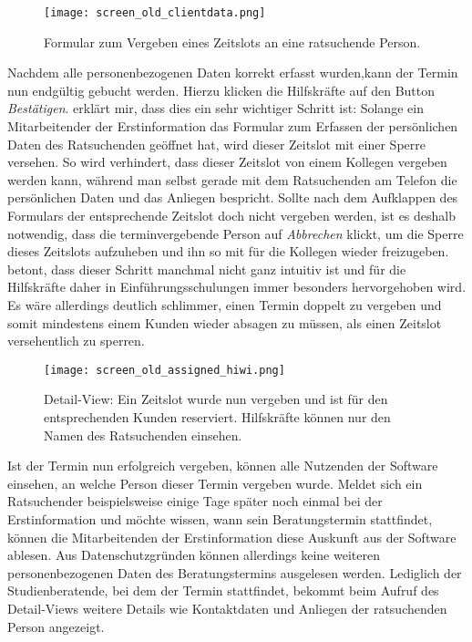 \begin{figure}[H]
    \caption{Formular zum Vergeben eines Zeitslots an eine ratsuchende Person.}
    \centering
    \texttt{[image: screen\_old\_clientdata.png]}
\end{figure}

Nachdem alle personenbezogenen Daten korrekt erfasst wurden,kann der Termin nun
endgültig gebucht werden. Hierzu klicken die Hilfskräfte auf den Button
\textit{Bestätigen}. \ipName erklärt mir, dass dies ein sehr wichtiger Schritt
ist: Solange ein Mitarbeitender der Erstinformation das Formular zum Erfassen
der persönlichen Daten des Ratsuchenden geöffnet hat, wird dieser Zeitslot mit
einer Sperre versehen. So wird verhindert, dass dieser Zeitslot von einem
Kollegen vergeben werden kann, während man selbst gerade mit dem Ratsuchenden
am Telefon die persönlichen Daten und das Anliegen bespricht. Sollte nach dem
Aufklappen des Formulars der entsprechende Zeitslot doch nicht vergeben werden,
ist es deshalb notwendig, dass die terminvergebende Person auf
\textit{Abbrechen} klickt, um die Sperre dieses Zeitslots aufzuheben und ihn
so mit für die Kollegen wieder freizugeben. \ipName betont, dass dieser Schritt
manchmal nicht ganz intuitiv ist und für die Hilfskräfte daher in
Einführungsschulungen immer besonders hervorgehoben wird. Es wäre allerdings
deutlich schlimmer, einen Termin doppelt zu vergeben und somit mindestens einem
Kunden wieder absagen zu müssen, als einen Zeitslot versehentlich zu sperren.

\begin{figure}[H]
    \caption{Detail-View: Ein Zeitslot wurde nun vergeben und ist für den entsprechenden Kunden reserviert. Hilfskräfte können nur den Namen des Ratsuchenden einsehen.}
    \centering
    \texttt{[image: screen\_old\_assigned\_hiwi.png]}
\end{figure}

Ist der Termin nun erfolgreich vergeben, können alle Nutzenden der Software
einsehen, an welche Person dieser Termin vergeben wurde. Meldet sich ein
Ratsuchender beispielsweise einige Tage später noch einmal bei der
Erstinformation und möchte wissen, wann sein Beratungstermin stattfindet,
können die Mitarbeitenden der Erstinformation diese Auskunft aus der Software
ablesen. Aus Datenschutzgründen können allerdings keine weiteren
personenbezogenen Daten des Beratungstermins ausgelesen werden. Lediglich der
Studienberatende, bei dem der Termin stattfindet, bekommt beim Aufruf des
Detail-Views weitere Details wie Kontaktdaten und Anliegen der ratsuchenden
Person angezeigt.


